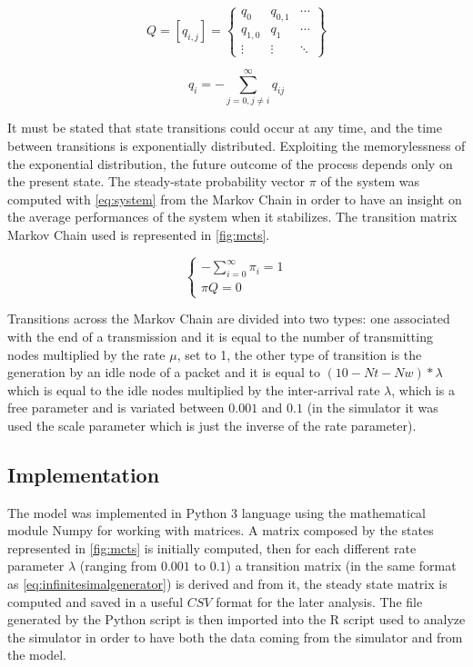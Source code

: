 \documentclass[conference]{IEEEtran}
\begin{document}
\begin{equation}
    Q=[q_{i,j}]=\begin{Bmatrix} q_{0} & q_{0,1} & \cdots \\ q_{1,0} & q_{1} & \cdots \\ \vdots & \vdots & \ddots \end{Bmatrix}\label{eq:infinitesimalgenerator}
\end{equation}

\begin{equation}
    q_i=-\sum_{j=0,j\neq i}^{\infty}q_{ij}\label{eq:qi}
\end{equation}

It must be stated that state transitions could occur at any time, and the time between transitions is exponentially distributed. Exploiting the memorylessness of the exponential distribution, the future outcome of the process depends only on the present state. The steady-state probability vector \(\pi\) of the system was computed with \cref{eq:system} from the Markov Chain in order to have an insight on the average performances of the system when it stabilizes. The transition matrix Markov Chain used is represented in \cref{fig:mcts}.

\begin{equation}
    \left\{\begin{matrix} -\sum_{i=0}^{\infty}\pi_i=1 \\ \pi Q=0 \end{matrix}\right.\label{eq:system}
\end{equation}

Transitions across the Markov Chain are divided into two types: one associated with the end of a transmission and it is equal to the number of transmitting nodes multiplied by the rate \(\mu\), set to 1, the other type of transition is the generation by an idle node of a packet and it is equal to $ (10 - Nt - Nw)*\lambda $ which is equal to the idle nodes multiplied by the inter-arrival rate $ \lambda $, which is a free parameter and is variated between \(0.001\) and  \(0.1\) (in the simulator it was used the scale parameter which is just the inverse of the rate parameter).

\subsection{Implementation}\label{sec:implementationmodel}
The model was implemented in Python 3 language using the mathematical module Numpy for working with matrices. A matrix composed by the states represented in \cref{fig:mcts} is initially computed, then for each different rate parameter $ \lambda $ (ranging from \(0.001\) to \(0.1\)) a transition matrix (in the same format as \cref{eq:infinitesimalgenerator}) is derived and from it, the steady state matrix is computed and saved in a useful \(CSV\) format for the later analysis. The file generated by the Python script is then imported into the R script used to analyze the simulator in order to have both the data coming from the simulator and from the model.
\end{document}
